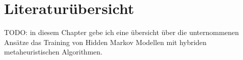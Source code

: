 \section{Literaturübersicht}
TODO: in diesem Chapter gebe ich eine übersicht über die unternommenen Ansätze das Training 
von Hidden Markov Modellen mit hybriden metaheuristischen Algorithmen.

